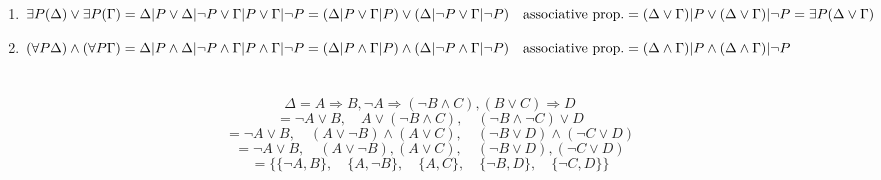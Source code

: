 \documentclass{article}
\begin{document}
\section{}
\renewcommand{\labelenumi}{(\alph{enumi})}
 \begin{enumerate}
   \item $\exists P (\Delta) \lor \exists P (\Gamma) \\
   = \Delta | P \lor \Delta | \lnot P \lor \Gamma | P \lor \Gamma | \lnot P \\
   = (\Delta | P \lor \Gamma | P) \lor (\Delta | \lnot P \lor \Gamma | \lnot P) \quad \textrm{associative prop.}\\
   = (\Delta \lor \Gamma) | P \lor (\Delta \lor \Gamma) | \lnot P \\
   = \exists P (\Delta \lor \Gamma) $
   \item $ (\forall P \Delta) \land (\forall P \Gamma) \\
   = \Delta | P \land \Delta | \lnot P \land \Gamma | P \land \Gamma | \lnot P \\
   = (\Delta | P \land \Gamma | P) \land (\Delta | \lnot P \land \Gamma | \lnot P) \quad \textrm{associative prop.}\\
   = (\Delta \land \Gamma) | P \land (\Delta \land \Gamma) | \lnot P$
 \end{enumerate}

 \section{}
 \[\Delta = A \Rightarrow B, \lnot A \Rightarrow (\lnot B \land C), (B \lor C) \Rightarrow D\]
 \[= \lnot A \lor B, \quad A \lor (\lnot B \land C), \quad (\lnot B \land \lnot C) \lor D\]
 \[= \lnot A \lor B, \quad (A \lor \lnot B) \land (A \lor C), \quad (\lnot B \lor D) \land (\lnot C \lor D)\]
 \[= \lnot A \lor B, \quad (A \lor \lnot B), (A \lor C), \quad (\lnot B \lor D), (\lnot C \lor D)\]
 \[= \{\{\lnot A, B\}, \quad \{A, \lnot B\}, \quad \{A, C\}, \quad \{\lnot B, D\}, \quad \{\lnot C, D\}\}\]
 
 \section{}
 
\end{document}
